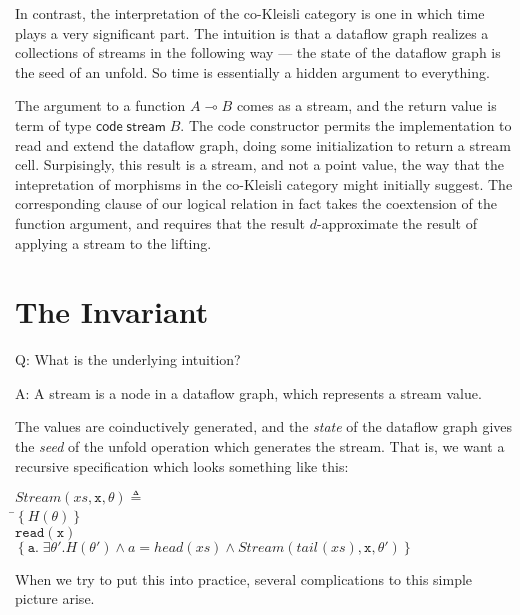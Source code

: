\documentclass[preprint]{sigplanconf}
\newcommand{\setof}[1]{\left\{{#1}\right\}}
\newcommand{\term}[1]{\ensuremath{\mathtt{{#1}}}}
\newcommand{\comp}[1]{\mathsf{code}\;{#1}}
\newcommand{\streamtype}[1]{\mathsf{stream}\;{#1}}
\newcommand{\lolli}{\multimap}
\newcommand{\head}[1]{\mathit{head}(#1)}
\newcommand{\tail}[2][]{\mathit{tail}^{#1}(#2)}
\begin{document}
In contrast, the interpretation of the co-Kleisli category is one in
which time plays a very significant part. The intuition is that a
dataflow graph realizes a collections of streams in the following way
--- the state of the dataflow graph is the seed of an unfold.  So time
is essentially a hidden argument to everything.

The argument to a function $A \lolli B$ comes as a stream, and the
return value is term of type $\comp{\streamtype{B}}$. The code
constructor permits the implementation to read and extend the dataflow
graph, doing some initialization to return a stream cell. Surpisingly,
this result is a stream, and not a point value, the way that the
intepretation of morphisms in the co-Kleisli category might initially
suggest. The corresponding clause of our logical relation in fact
takes the coextension of the function argument, and requires that the
result $d$-approximate the result of applying a stream to the lifting. 

\section{The Invariant}

Q: What is the underlying intuition?

\noindent A: A stream is a node in a dataflow graph, which represents a stream value. 

The values are coinductively generated, and the \emph{state} of the
dataflow graph gives the \emph{seed} of the unfold operation which
generates the stream. That is, we want a recursive specification 
which looks something like this: 

\begin{tabbing}
$\mathit{Stream}(xs, \term{x}, \theta) \triangleq$  \\
\;\;\=$\setof{H(\theta)}$  \\
    \>\term{read(x)} \\
    \>$\setof{\term{a}.\;\exists \theta'. H(\theta') \land a = \head{xs} \land 
                           \mathit{Stream}(\tail{xs},\term{x}, \theta')}$ \\
\end{tabbing}

When we try to put this into practice, several complications to this
simple picture arise.
\end{document}
